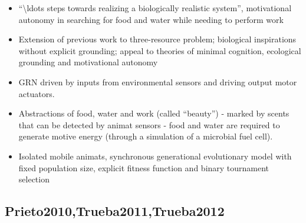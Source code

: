 		\begin{itemize}
			\item
			
			``\textbackslash{}ldots steps towards realizing a biologically
			realistic system'', motivational autonomy in searching for food and
			water while needing to perform work
			
			\item
			
			Extension of previous work to three-resource problem; biological
			inspirations without explicit grounding; appeal to theories of minimal
			cognition, ecological grounding and motivational autonomy
			
			\item
			
			GRN driven by inputs from environmental sensors and driving output
			motor actuators.
			
			\item
			
			Abstractions of food, water and work (called ``beauty'') - marked by
			scents that can be detected by animat sensors - food and water are
			required to generate motive energy (through a simulation of a
			microbial fuel cell).
			
			\item
			
			Isolated mobile animats, synchronous generational evolutionary model
			with fixed population size, explicit fitness function and binary
			tournament selection
			
		\end{itemize}
		
		\hypertarget{prieto2010trueba2011trueba2012}{\subsection{Prieto2010,Trueba2011,Trueba2012}\label{prieto2010trueba2011trueba2012}}
		
